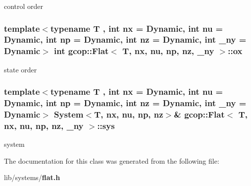 control order 

\subsubsection[{ox}]{\setlength{\rightskip}{0pt plus 5cm}template$<$typename T , int nx = \-Dynamic, int nu = \-Dynamic, int np = \-Dynamic, int nz = \-Dynamic, int \-\_\-ny = \-Dynamic$>$ int {\bf gcop\-::\-Flat}$<$ \-T, nx, nu, {\bf np}, nz, \-\_\-ny $>$\-::{\bf ox}}\label{classgcop_1_1Flat_a13792aedca16a7dcad77a947bc251518}


state order 

\subsubsection[{sys}]{\setlength{\rightskip}{0pt plus 5cm}template$<$typename T , int nx = \-Dynamic, int nu = \-Dynamic, int np = \-Dynamic, int nz = \-Dynamic, int \-\_\-ny = \-Dynamic$>$ {\bf \-System}$<$\-T, nx, nu, {\bf np}, nz$>$\& {\bf gcop\-::\-Flat}$<$ \-T, nx, nu, {\bf np}, nz, \-\_\-ny $>$\-::{\bf sys}}\label{classgcop_1_1Flat_aaa1d0ff9f7e3ff5b2687f5cb95f9883b}


system 



\-The documentation for this class was generated from the following file\-:\begin{DoxyCompactItemize}
\item 
lib/systems/{\bf flat.\-h}\end{DoxyCompactItemize}
